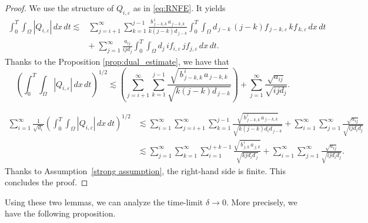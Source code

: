 \documentclass[a4paper,12pt,reqno]{amsart}
\theoremstyle{plain}
\numberwithin{equation}{section}
\begin{document}
	\begin{proof}
		We use the structure of $Q_{i,\varepsilon}$ as in \eqref{eq:RNFE}. It yields
		\begin{align*}
			\int_{0}^{T} \int_{\Omega} |Q_{i,\varepsilon}| \, dx\, dt \lesssim&
			\sum_{j=i+1}^{\infty} \sum_{k=1}^{j-1}
			\frac{b^{\,i}_{\,j-k,k}\, a_{\,j-k,k}}{k(j-k)d_{\,j-k}}
			\int_{0}^{T} \int_{\Omega} d_{\,j-k}\,(j-k) f_{\,j-k,\varepsilon}\, kf_{\,k,\varepsilon}\, dx\, dt\\
			&+\;
			\sum_{j=1}^{\infty}
			\frac{a_{i j}}{i j d_{j}}
			\int_{0}^{T} \int_{\Omega} d_{j}\, if_{i,\varepsilon}\, j f_{j,\varepsilon}\, dx\, dt.
		\end{align*}
		Thanks to the Proposition \ref{prop:dual_estimate}, we have that 
		\[
		\left( \int_{0}^{T} \int_{\Omega} |Q_{i,\varepsilon}| \, dx\, dt \right)^{1/2}
		\lesssim \left(
		\sum_{j=i+1}^{\infty} \sum_{k=1}^{j-1}
		\frac{\sqrt{\, b^{\,i}_{\,j-k,k}\, a_{\,j-k,k}}}{\sqrt{k (j-k)d_{\,j-k}}}
		\right)
		+
		\sum_{j=1}^{\infty}
		\frac{\sqrt{a_{i j}}}{\sqrt{i j d_j}} .
		\]
		
		\begin{align*}
			\sum_{i=1}^{\infty}\frac{1}{\sqrt{d_i}}
			\left( 
			\int_{0}^{T} \int_{\Omega} |Q_{i,\varepsilon}| \, dx\,dt 
			\right)^{1/2}
			&\lesssim 
			\sum_{i=1}^{\infty}
			\sum_{j=i+1}^{\infty}
			\sum_{k=1}^{j-1}
			\frac{\sqrt{\, b^{\,i}_{\,j-k,k}\, a_{\,j-k,k}}}{\sqrt{k(j-k)d_id_{\,j-k}}}
			+
			\sum_{i=1}^{\infty}\sum_{j=1}^{\infty} 
			\frac{\sqrt{a_{i j}}}{\sqrt{ij d_id_j}}\\
			&\lesssim	\sum_{j=1}^{\infty}
			\sum_{k=1}^{\infty}
			\sum_{i=1}^{j+k-1}
			\frac{\sqrt{\, b^{\,i}_{\,j,k}\, a_{\,j,k}}}{\sqrt{kjd_id_{\,j}}}
			+
			\sum_{i=1}^{\infty}\sum_{j=1}^{\infty} 
			\frac{\sqrt{a_{i j}}}{\sqrt{ijd_id_j}}.
		\end{align*}    
		Thanks to Assumption~\ref{strong assumption}, the right-hand side is finite. This concludes the proof.
	\end{proof}
	Using these two lemmas, we can analyze the time-limit $\delta \to 0$. More precisely, we have the following proposition.
\end{document}
